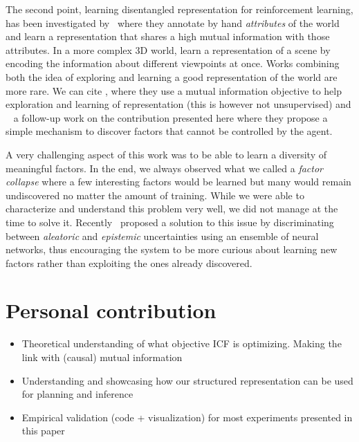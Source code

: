 The second point, learning disentangled representation for reinforcement
learning, has been investigated by~\citet{anand2019unsupervised} where they
annotate by hand \emph{attributes} of the world and learn a representation that
shares a high mutual information with those attributes. In a more complex 3D
world, \citet{eslami2018neural} learn a representation of a scene by encoding the information about different viewpoints at once. Works combining both the idea of exploring and learning a good representation of the world are more rare. We can cite \citet{kim2019emi}, where they use a mutual information objective to help exploration and learning of representation (this is however not unsupervised) and ~\citet{li2018disentangled} a follow-up work on the contribution presented here where they propose a simple mechanism to discover factors that cannot be controlled by the agent.

A very challenging aspect of this work was to be able to learn a diversity of meaningful factors. In the end, we always observed what we called a \emph{factor collapse} where a few interesting factors would be learned but many would remain undiscovered no matter the amount of training. While we were able to characterize and understand this problem very well, we did not manage at the time to solve it. Recently~\citet{strouse2021learning} proposed a solution to this issue by discriminating between \emph{aleatoric} and \emph{epistemic} uncertainties using an ensemble of neural networks, thus encouraging the system to be more curious about learning new factors rather than exploiting the ones already discovered.

\section*{Personal contribution}
\begin{itemize}
    \item Theoretical understanding of what objective ICF is optimizing. Making the link with (causal) mutual information
    \item Understanding and showcasing how our structured representation can be used for planning and inference
    \item Empirical validation (code + visualization) for most experiments presented in this paper
\end{itemize}

\newpage


